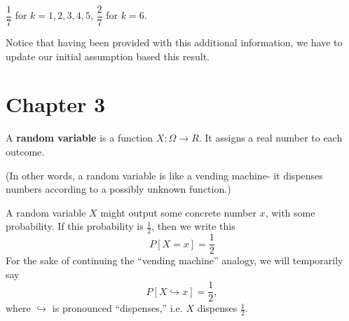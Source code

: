 \documentclass[../main.tex]{subfiles}
\begin{document}
\begin{solution}[Answer.]
$\dfrac{1}{7}$ for $k = 1, 2, 3, 4, 5$, $\dfrac{2}{7}$ for $k = 6$. 
\end{solution}

\begin{solution} 
\end{solution}

Notice that having been provided with this additional information, we have to update our initial assumption based this result.  



\section{Chapter 3}
\begin{definition}
A \textbf{random variable} is a function $X : \Omega \rightarrow R$. It assigns a real number to each outcome. 
\end{definition}
(In other words, a random variable is like a vending machine- it dispenses numbers according to a possibly unknown function.)

A random variable $X$ might output some concrete number $x$, with some probability. If this probability is $\frac 12$, then we write this
\[
	P[X = x] = \frac 12
\]
For the sake of continuing the ``vending machine'' analogy, we will temporarily say \[P[X \hookrightarrow x] = \frac 12,\] where $\hookrightarrow$ is pronounced ``dispenses,'' i.e. $X$ dispenses $\frac 12$. 
\end{document}
